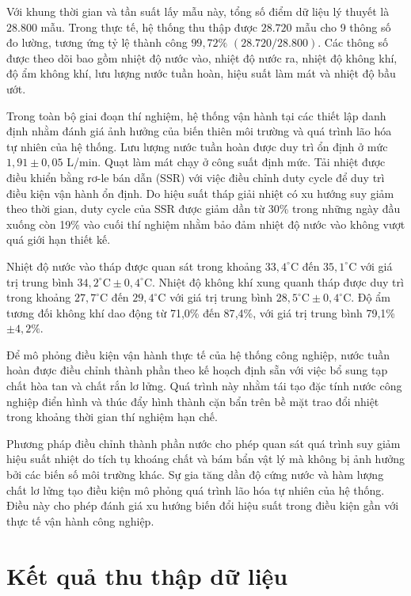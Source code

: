 \documentclass[../main.tex]{subfiles}
\begin{document}
Với khung thời gian và tần suất lấy mẫu này, tổng số điểm dữ liệu lý thuyết là $28.800$ mẫu. Trong thực tế, hệ thống thu thập được $28.720$ mẫu cho 9 thông số đo lường, tương ứng tỷ lệ thành công $99{,}72\%$ $(28.720/28.800)$. Các thông số được theo dõi bao gồm nhiệt độ nước vào, nhiệt độ nước ra, nhiệt độ không khí, độ ẩm không khí, lưu lượng nước tuần hoàn, hiệu suất làm mát và nhiệt độ bầu ướt.

Trong toàn bộ giai đoạn thí nghiệm, hệ thống vận hành tại các thiết lập danh định nhằm đánh giá ảnh hưởng của biến thiên môi trường và quá trình lão hóa tự nhiên của hệ thống. Lưu lượng nước tuần hoàn được duy trì ổn định ở mức \(1{,}91 \pm 0{,}05\) L/min. Quạt làm mát chạy ở công suất định mức. Tải nhiệt được điều khiển bằng rơ-le bán dẫn (SSR) với việc điều chỉnh duty cycle để duy trì điều kiện vận hành ổn định. Do hiệu suất tháp giải nhiệt có xu hướng suy giảm theo thời gian, duty cycle của SSR được giảm dần từ 30\% trong những ngày đầu xuống còn 19\% vào cuối thí nghiệm nhằm bảo đảm nhiệt độ nước vào không vượt quá giới hạn thiết kế.

Nhiệt độ nước vào tháp được quan sát trong khoảng \(33{,}4^\circ\mathrm{C}\) đến \(35{,}1^\circ\mathrm{C}\) với giá trị trung bình \(34{,}2^\circ\mathrm{C} \pm 0{,}4^\circ\mathrm{C}\). Nhiệt độ không khí xung quanh tháp được duy trì trong khoảng \(27{,}7^\circ\mathrm{C}\) đến \(29{,}4^\circ\mathrm{C}\) với giá trị trung bình \(28{,}5^\circ\mathrm{C} \pm 0{,}4^\circ\mathrm{C}\). Độ ẩm tương đối không khí dao động từ 71{,}0\% đến 87{,}4\%, với giá trị trung bình 79{,}1\% \(\pm 4{,}2\%\).

Để mô phỏng điều kiện vận hành thực tế của hệ thống công nghiệp, nước tuần hoàn được điều chỉnh thành phần theo kế hoạch định sẵn với việc bổ sung tạp chất hòa tan và chất rắn lơ lửng. Quá trình này nhằm tái tạo đặc tính nước công nghiệp điển hình và thúc đẩy hình thành cặn bẩn trên bề mặt trao đổi nhiệt trong khoảng thời gian thí nghiệm hạn chế.

Phương pháp điều chỉnh thành phần nước cho phép quan sát quá trình suy giảm hiệu suất nhiệt do tích tụ khoáng chất và bám bẩn vật lý mà không bị ảnh hưởng bởi các biến số môi trường khác. Sự gia tăng dần độ cứng nước và hàm lượng chất lơ lửng tạo điều kiện mô phỏng quá trình lão hóa tự nhiên của hệ thống. Điều này cho phép đánh giá xu hướng biến đổi hiệu suất trong điều kiện gần với thực tế vận hành công nghiệp.

\section{Kết quả thu thập dữ liệu}
\label{sec:data_collection_results}
\end{document}
